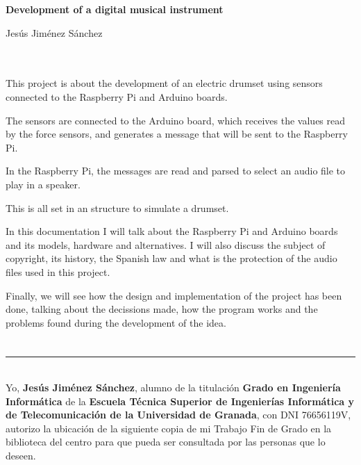 \cleardoublepage

\thispagestyle{empty}

\begin{center}
       {\large\bfseries Development of a digital musical instrument}\\
\end{center}

\begin{center}
    Jesús Jiménez Sánchez\\
\end{center}

\\

\vspace{0.7cm}
\\

This project is about the development of an electric drumset using sensors connected to the Raspberry Pi and Arduino
boards.

The sensors are connected to the Arduino board, which receives the values read by the force sensors, and generates a
message that will be sent to the Raspberry Pi.

In the Raspberry Pi, the messages are read and parsed to select an audio file to play in a speaker.

This is all set in an structure to simulate a drumset.

In this documentation I will talk about the Raspberry Pi and Arduino boards and its models, hardware and alternatives. I
will also discuss the subject of copyright, its history, the Spanish law and what is the protection of the audio files
used in this project.

Finally, we will see how the design and implementation of the project has been done, talking about the decissions made,
how the program works and the problems found during the development of the idea.

\chapter*{}   %

\thispagestyle{empty}

\noindent\rule[-1ex]{\textwidth}{2pt}\\[4.5ex]

Yo, \textbf{Jesús Jiménez Sánchez}, alumno de la titulación \textbf{Grado en Ingeniería Informática} de la
\textbf{Escuela Técnica Superior de Ingenierías Informática y de Telecomunicación de la Universidad de Granada}, con DNI
76656119V, autorizo la ubicación de la siguiente copia de mi Trabajo Fin de Grado en la biblioteca del centro para que
pueda ser consultada por las personas que lo deseen.

